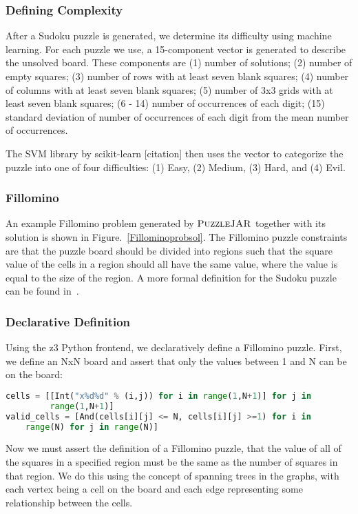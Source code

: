 \subsubsection*{Defining Complexity}
After a Sudoku puzzle is generated, we determine its difficulty using
machine learning. For each puzzle we use, a 15-component vector is generated to describe the unsolved board. These components are (1) number of solutions; (2) number of empty squares; (3) number of rows with at least seven blank squares; (4) number of columns with at least seven blank squares; (5) number of 3x3 grids with at least seven blank squares; (6 - 14) number of occurrences of each digit; (15) standard deviation of number of occurrences of each digit from the mean number of occurrences.

The SVM library by scikit-learn [citation] then uses the vector to categorize the
puzzle into one of four difficulties: (1) Easy, (2) Medium, (3) Hard,
and (4) Evil.

\subsubsection{Fillomino}

An example Fillomino problem generated by $\textsc{PuzzleJAR}$ together with its
solution is shown in Figure.~\ref{Fillominoprobsol}. The Fillomino puzzle constraints are that the puzzle board should be divided into regions such that the square value of the cells in a region should all have the same value, where the value is equal to the size of the region. A more formal definition for the Sudoku puzzle can be found in~\cite{fillominodef}.

\subsubsection*{Declarative Definition}
Using the z3 Python frontend, we declaratively define a Fillomino puzzle.
First, we define an NxN board and assert that only the values between
1 and N can be on the board: 

\singlespace
\begin{lstlisting}[language=python, frame=single]
cells = [[Int("x%d%d" % (i,j)) for i in range(1,N+1)] for j in
         range(1,N+1)]
valid_cells = [And(cells[i][j] <= N, cells[i][j] >=1) for i in
	range(N) for j in range(N)]
\end{lstlisting}
\doublespace

Now we must assert the definition of a Fillomino puzzle, that the
value of all of the squares in a specified region must be the same as
the number of squares in that region. We do this using the concept of
spanning trees in the graphs, with each vertex being a cell on the board
and each edge representing some relationship between the cells.

